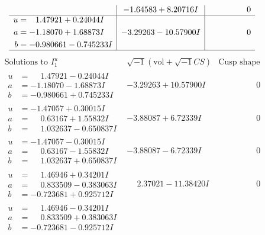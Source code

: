 \documentclass[1p]{elsarticle_modified}
\theoremstyle{definition}
\newcommand{\I}{\sqrt{-1}}
\begin{document}
$$\begin{array}{c|c|c}
 & -1.64583 + 8.20716 I & \phantom{-0.000000 } 0 \\ \hline\begin{aligned}
u &= \phantom{-}1.47921 + 0.24044 I \\
a &= -1.18070 + 1.68873 I \\
b &= -0.980661 - 0.745233 I\end{aligned}
 & -3.29263 - 10.57900 I & \phantom{-0.000000 } 0\\
 \hline 
 \end{array}$$\newpage$$\begin{array}{c|c|c}  
\text{Solutions to }I^u_{1}& \I (\text{vol} + \sqrt{-1}CS) & \text{Cusp shape}\\
 \hline 
\begin{aligned}
u &= \phantom{-}1.47921 - 0.24044 I \\
a &= -1.18070 - 1.68873 I \\
b &= -0.980661 + 0.745233 I\end{aligned}
 & -3.29263 + 10.57900 I & \phantom{-0.000000 } 0 \\ \hline\begin{aligned}
u &= -1.47057 + 0.30015 I \\
a &= \phantom{-}0.63167 + 1.55832 I \\
b &= \phantom{-}1.032637 - 0.650837 I\end{aligned}
 & -3.88087 + 6.72339 I & \phantom{-0.000000 } 0 \\ \hline\begin{aligned}
u &= -1.47057 - 0.30015 I \\
a &= \phantom{-}0.63167 - 1.55832 I \\
b &= \phantom{-}1.032637 + 0.650837 I\end{aligned}
 & -3.88087 - 6.72339 I & \phantom{-0.000000 } 0 \\ \hline\begin{aligned}
u &= \phantom{-}1.46946 + 0.34201 I \\
a &= \phantom{-}0.833509 - 0.383063 I \\
b &= -0.723681 + 0.925712 I\end{aligned}
 & \phantom{-}2.37021 - 11.38420 I & \phantom{-0.000000 } 0 \\ \hline\begin{aligned}
u &= \phantom{-}1.46946 - 0.34201 I \\
a &= \phantom{-}0.833509 + 0.383063 I \\
b &= -0.723681 - 0.925712 I\end{aligned}

\end{array}$$
\end{document}
